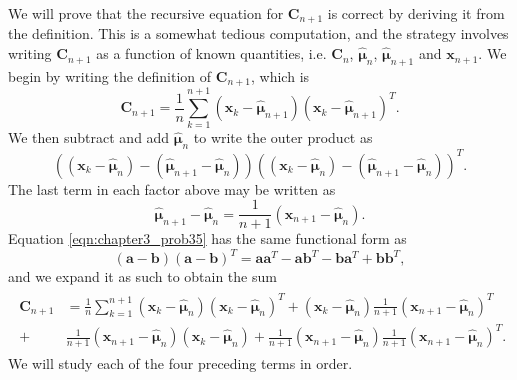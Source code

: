 \documentclass[12pt, a4paper]{article}
\newcommand{\vect}[1]{\bm{#1}}
\begin{document}
\begin{easylist}[enumerate]
	We will prove that the recursive equation for $\vect{C}_{n+1}$ is correct by deriving it from the definition.
	This is a somewhat tedious computation, and the strategy involves writing $\vect{C}_{n+1}$ as a function of known quantities, i.e. $\vect{C}_{n}$, $\hat{\vect{\mu}}_n$, $\hat{\vect{\mu}}_{n+1}$ and $\vect{x}_{n+1}$.
	We begin by writing the definition of $\vect{C}_{n+1}$, which is
	\begin{equation*}
	\vect{C}_{n+1} = \frac{1}{n} \sum_{k=1}^{n+1} \left( \vect{x}_k - \hat{\vect{\mu}}_{n+1}\right) \left( \vect{x}_k - \hat{\vect{\mu}}_{n+1}\right)^T.
	\end{equation*}
	We then subtract and add $\hat{\vect{\mu}}_{n}$ to write the outer product as
	\begin{equation}
	\label{eqn:chapter3_prob35}
	\left( 
	\left( \vect{x}_k - \hat{\vect{\mu}}_{n}\right)
	- 
	\left( \hat{\vect{\mu}}_{n+1} - \hat{\vect{\mu}}_{n} \right)
	\right) 
	\left( 
	\left( \vect{x}_k - \hat{\vect{\mu}}_{n}\right)
	- 
	\left( \hat{\vect{\mu}}_{n+1} - \hat{\vect{\mu}}_{n} \right)
	\right) ^T.
	\end{equation}
	The last term in each factor above may be written as
	\begin{equation*}
	\hat{\vect{\mu}}_{n+1} - \hat{\vect{\mu}}_{n} = \frac{1}{n +1} \left( \vect{x}_{n+1} -  \hat{\vect{\mu}}_{n} \right).
	\end{equation*}
	Equation \eqref{eqn:chapter3_prob35} has the same functional form as 
	\begin{equation*}
	(\vect{a} - \vect{b}) (\vect{a} - \vect{b})^T = \vect{a} \vect{a}^T - \vect{a} \vect{b}^T - \vect{b}\vect{a}^T + \vect{b} \vect{b}^T,
	\end{equation*}
	and we expand it as such to obtain the sum
	\begin{align}
	\begin{split}
	\label{eqn:eq3_problem35_2}
	\vect{C}_{n+1} &= \frac{1}{n} \sum_{k=1}^{n+1}  
	\left( \vect{x}_k  - \hat{\vect{\mu}}_n \right)\left( \vect{x}_k  - \hat{\vect{\mu}}_n \right)^T 
	+  \left( \vect{x}_{k}  - \hat{\vect{\mu}}_n \right) \frac{1}{n+1}\left( \vect{x}_{n+1} - \hat{\vect{\mu}}_n \right)^T \\
	+ &   \frac{1}{n+1}\left( \vect{x}_{n+1} - \hat{\vect{\mu}}_n \right)   \left( \vect{x}_k  - \hat{\vect{\mu}}_n \right) 
	+  \frac{1}{n+1}\left( \vect{x}_{n+1} - \hat{\vect{\mu}}_n \right) \frac{1}{n+1}\left( \vect{x}_{n+1} - \hat{\vect{\mu}}_n \right)^T.
	\end{split}
	\end{align}
	We will study each of the four preceding terms in order.
	

\end{easylist}
\end{document}

